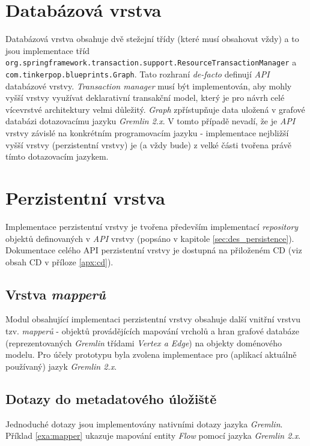 \section{Databázová vrstva}
Databázová vrstva obsahuje dvě stežejní třídy (které musí obsahovat vždy) a to jsou implementace tříd \texttt{org.springframework.transaction.support.ResourceTransactionManager} a \texttt{com.tinkerpop.blueprints.Graph}. Tato rozhraní \textit{de-facto} definují \textit{API} databázové vrstvy. \textit{Transaction manager} musí být implementován, aby mohly vyšší vrstvy využívat deklarativní transakční model, který je pro návrh celé vícevrstvé architektury velmi důležitý. \textit{Graph} zpřístupňuje data uložená v grafové databázi dotazovacímu jazyku \textit{Gremlin 2.x}. V tomto případě nevadí, že je \textit{API} vrstvy závislé na konkrétním programovacím jazyku - implementace nejbližší vyšší vrstvy (perzistentní vrstvy) je (a vždy bude) z velké části tvořena právě tímto dotazovacím jazykem.

\section{Perzistentní vrstva}
Implementace perzistentní vrstvy je tvořena především implementací \textit{repository} objektů definovaných v \textit{API} vrstvy (popsáno v kapitole \ref{sec:des_persistence}). Dokumentace celého API perzistentní vrstvy je dostupná na přiloženém CD (viz obsah CD v příloze \ref{apx:cd}).

\subsection{Vrstva \textit{mapperů}}
Modul obsahující implementaci perzistentní vrstvy obsahuje další vnitřní vrstvu tzv. \textit{mapperů} - objektů provádějících mapování vrcholů a hran grafové databáze (reprezentovaných \textit{Gremlin} třídami \textit{Vertex a Edge}) na objekty doménového modelu.  Pro účely prototypu byla zvolena implementace pro (aplikací aktuálně používaný) jazyk \textit{Gremlin 2.x}.

\subsection{Dotazy do metadatového úložiště}
Jednoduché dotazy jsou implementovány nativními dotazy jazyka \textit{Gremlin}. Příklad \ref{exa:mapper} ukazuje mapování entity \textit{Flow} pomocí jazyka \textit{Gremlin 2.x}.



